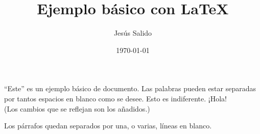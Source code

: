 \documentclass[11pt,a4paper]{article}
\title{Ejemplo básico con \LaTeX}
\author{Jesús Salido}
\date{\today}
\begin{document}
\maketitle


\noindent “Este” es un ejemplo básico de documento. Las palabras pueden estar separadas por tantos espacios en blanco como se desee. Esto es indiferente. ¡Hola!\\[5cm]

(Los cambios que se reflejan son los añadidos.)

Los párrafos quedan separados por una, o varias, líneas en blanco.
           
                 
\end{document}

